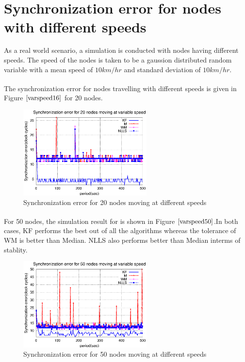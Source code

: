 \documentclass[a4paper,10pt]{report}
\begin{document}
\section{\textbf{Synchronization error for nodes with different speeds}}
As a real world scenario, a simulation is conducted with nodes having different speeds. The speed of the nodes is taken to be a gaussion distributed random variable with a mean speed of $10km/hr$ and standard deviation of $10km/hr$.
\paragraph*{}
The synchronization error for nodes travelling with different speeds is given in Figure $\ref{varspeed16}$ for 20 nodes.
\begin{figure}
 \centering
 \includegraphics[width=0.6\textwidth]{varspeed20}
 \caption{Synchronization error for 20 nodes moving at different speeds}
 \label{varspeed16}
\end{figure}
\paragraph*{}
For 50 nodes, the simulation result for is shown in Figure $\ref{varspeed50}$.In both cases, KF performs the best out of all the algorithms whereas the tolerance of WM is better than Median. NLLS also performs better than Median interms of stablity.
\begin{figure}
 \centering
 \includegraphics[width=0.6\textwidth]{varspeed50}
 \caption{Synchronization error for 50 nodes moving at different speeds}
 \label{varspeed50}
\end{figure}
\end{document}
